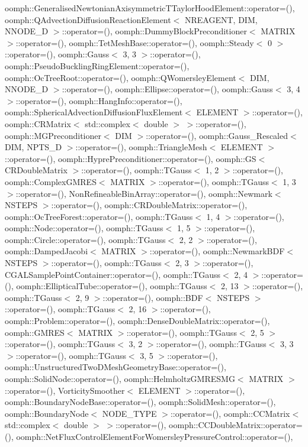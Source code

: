 oomph\+::\+Generalised\+Newtonian\+Axisymmetric\+T\+Taylor\+Hood\+Element\+::operator=(), oomph\+::\+Q\+Advection\+Diffusion\+Reaction\+Element$<$ N\+R\+E\+A\+G\+E\+N\+T, D\+I\+M, N\+N\+O\+D\+E\+\_\+D $>$\+::operator=(), oomph\+::\+Dummy\+Block\+Preconditioner$<$ M\+A\+T\+R\+I\+X $>$\+::operator=(), oomph\+::\+Tet\+Mesh\+Base\+::operator=(), oomph\+::\+Steady$<$ 0 $>$\+::operator=(), oomph\+::\+Gauss$<$ 3, 3 $>$\+::operator=(), oomph\+::\+Pseudo\+Buckling\+Ring\+Element\+::operator=(), oomph\+::\+Oc\+Tree\+Root\+::operator=(), oomph\+::\+Q\+Womersley\+Element$<$ D\+I\+M, N\+N\+O\+D\+E\+\_\+D $>$\+::operator=(), oomph\+::\+Ellipse\+::operator=(), oomph\+::\+Gauss$<$ 3, 4 $>$\+::operator=(), oomph\+::\+Hang\+Info\+::operator=(), oomph\+::\+Spherical\+Advection\+Diffusion\+Flux\+Element$<$ E\+L\+E\+M\+E\+N\+T $>$\+::operator=(), oomph\+::\+C\+R\+Matrix$<$ std\+::complex$<$ double $>$ $>$\+::operator=(), oomph\+::\+M\+G\+Preconditioner$<$ D\+I\+M $>$\+::operator=(), oomph\+::\+Gauss\+\_\+\+Rescaled$<$ D\+I\+M, N\+P\+T\+S\+\_\+D $>$\+::operator=(), oomph\+::\+Triangle\+Mesh$<$ E\+L\+E\+M\+E\+N\+T $>$\+::operator=(), oomph\+::\+Hypre\+Preconditioner\+::operator=(), oomph\+::\+G\+S$<$ C\+R\+Double\+Matrix $>$\+::operator=(), oomph\+::\+T\+Gauss$<$ 1, 2 $>$\+::operator=(), oomph\+::\+Complex\+G\+M\+R\+E\+S$<$ M\+A\+T\+R\+I\+X $>$\+::operator=(), oomph\+::\+T\+Gauss$<$ 1, 3 $>$\+::operator=(), Non\+Refineable\+Bin\+Array\+::operator=(), oomph\+::\+Newmark$<$ N\+S\+T\+E\+P\+S $>$\+::operator=(), oomph\+::\+C\+R\+Double\+Matrix\+::operator=(), oomph\+::\+Oc\+Tree\+Forest\+::operator=(), oomph\+::\+T\+Gauss$<$ 1, 4 $>$\+::operator=(), oomph\+::\+Node\+::operator=(), oomph\+::\+T\+Gauss$<$ 1, 5 $>$\+::operator=(), oomph\+::\+Circle\+::operator=(), oomph\+::\+T\+Gauss$<$ 2, 2 $>$\+::operator=(), oomph\+::\+Damped\+Jacobi$<$ M\+A\+T\+R\+I\+X $>$\+::operator=(), oomph\+::\+Newmark\+B\+D\+F$<$ N\+S\+T\+E\+P\+S $>$\+::operator=(), oomph\+::\+T\+Gauss$<$ 2, 3 $>$\+::operator=(), C\+G\+A\+L\+Sample\+Point\+Container\+::operator=(), oomph\+::\+T\+Gauss$<$ 2, 4 $>$\+::operator=(), oomph\+::\+Elliptical\+Tube\+::operator=(), oomph\+::\+T\+Gauss$<$ 2, 13 $>$\+::operator=(), oomph\+::\+T\+Gauss$<$ 2, 9 $>$\+::operator=(), oomph\+::\+B\+D\+F$<$ N\+S\+T\+E\+P\+S $>$\+::operator=(), oomph\+::\+T\+Gauss$<$ 2, 16 $>$\+::operator=(), oomph\+::\+Problem\+::operator=(), oomph\+::\+Dense\+Double\+Matrix\+::operator=(), oomph\+::\+G\+M\+R\+E\+S$<$ M\+A\+T\+R\+I\+X $>$\+::operator=(), oomph\+::\+T\+Gauss$<$ 2, 5 $>$\+::operator=(), oomph\+::\+T\+Gauss$<$ 3, 2 $>$\+::operator=(), oomph\+::\+T\+Gauss$<$ 3, 3 $>$\+::operator=(), oomph\+::\+T\+Gauss$<$ 3, 5 $>$\+::operator=(), oomph\+::\+Unstructured\+Two\+D\+Mesh\+Geometry\+Base\+::operator=(), oomph\+::\+Solid\+Node\+::operator=(), oomph\+::\+Helmholtz\+G\+M\+R\+E\+S\+M\+G$<$ M\+A\+T\+R\+I\+X $>$\+::operator=(), Vorticity\+Smoother$<$ E\+L\+E\+M\+E\+N\+T $>$\+::operator=(), oomph\+::\+Boundary\+Node\+Base\+::operator=(), oomph\+::\+Solid\+Mesh\+::operator=(), oomph\+::\+Boundary\+Node$<$ N\+O\+D\+E\+\_\+\+T\+Y\+P\+E $>$\+::operator=(), oomph\+::\+C\+C\+Matrix$<$ std\+::complex$<$ double $>$ $>$\+::operator=(), oomph\+::\+C\+C\+Double\+Matrix\+::operator=(), oomph\+::\+Net\+Flux\+Control\+Element\+For\+Womersley\+Pressure\+Control\+::operator=(), 